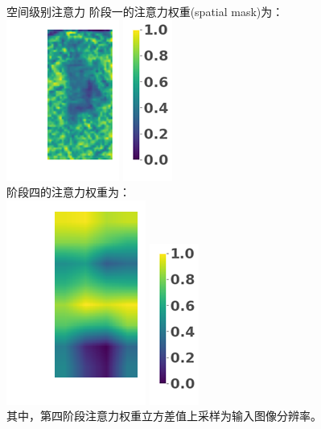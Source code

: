 \documentclass[usenames,dvipsnames,notes]{beamer}
\begin{document}
\begin{frame}{空间级别注意力}
	阶段一的注意力权重(spatial mask)为：\\
	\includegraphics[height=.3\textheight]{fig/spatial-high-mask.png} \includegraphics[height=.3\textheight]{fig/colorbar.png} \\
	阶段四的注意力权重为：\\
	\includegraphics[height=.3\textheight]{fig/spatial-low-mask.png} \includegraphics[height=.3\textheight]{fig/colorbar.png} \\
	其中，第四阶段注意力权重立方差值上采样为输入图像分辨率。
\end{frame}
\end{document}
